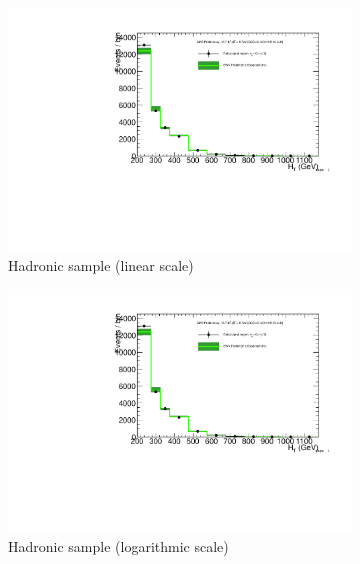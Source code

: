 \clearpage
\begin{figure}[h!]
  \centering
  \begin{subfigure}[b]{0.48\textwidth}
    \includegraphics[width=\textwidth,page=1]
    {Figs/results/v0/greenBand/bestFit_2012dev_RQcdZero_fZinvAll_0b_le3j-12p_smOnly}
    \caption{Hadronic sample (linear scale)}
  \end{subfigure}
  \begin{subfigure}[b]{0.48\textwidth}
    \includegraphics[width=\textwidth,page=2]
    {Figs/results/v0/greenBand/bestFit_2012dev_RQcdZero_fZinvAll_0b_le3j-12p_smOnly}
    \caption{Hadronic sample (logarithmic scale)}
  \end{subfigure}
  \begin{subfigure}[b]{0.48\textwidth}

\end{subfigure}
\end{figure}
